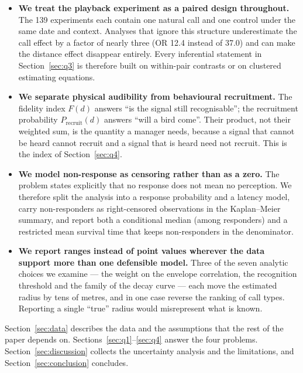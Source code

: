 \begin{itemize}[leftmargin=1.6em,itemsep=2pt]
  \item \textbf{We treat the playback experiment as a paired design throughout.} The 139
        experiments each contain one natural call and one control under the same date and
        context. Analyses that ignore this structure underestimate the call effect by a factor
        of nearly three (OR 12.4 instead of 37.0) and can make the distance effect disappear
        entirely. Every inferential statement in Section~\ref{sec:q3} is therefore built on
        within-pair contrasts or on clustered estimating equations.
  \item \textbf{We separate physical audibility from behavioural recruitment.} The fidelity
        index $F(d)$ answers ``is the signal still recognisable''; the recruitment probability
        $P_{\mathrm{recruit}}(d)$ answers ``will a bird come''. Their product, not their weighted
        sum, is the quantity a manager needs, because a signal that cannot be heard cannot
        recruit and a signal that is heard need not recruit. This is the index of Section~\ref{sec:q4}.
  \item \textbf{We model non-response as censoring rather than as a zero.} The problem states
        explicitly that no response does not mean no perception. We therefore split the analysis
        into a response probability and a latency model, carry non-responders as right-censored
        observations in the Kaplan--Meier summary, and report both a conditional median (among
        responders) and a restricted mean survival time that keeps non-responders in the
        denominator.
  \item \textbf{We report ranges instead of point values wherever the data support more than
        one defensible model.} Three of the seven analytic choices we examine --- the weight on
        the envelope correlation, the recognition threshold and the family of the decay curve ---
        each move the estimated radius by tens of metres, and in one case reverse the ranking of
        call types. Reporting a single ``true'' radius would misrepresent what is known.
\end{itemize}

Section~\ref{sec:data} describes the data and the assumptions that the rest of the paper depends
on. Sections~\ref{sec:q1}--\ref{sec:q4} answer the four problems. Section~\ref{sec:discussion}
collects the uncertainty analysis and the limitations, and Section~\ref{sec:conclusion} concludes.

